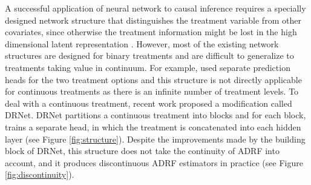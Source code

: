\documentclass{article} %
\begin{document}
A successful application of neural network to causal inference requires a specially designed network structure that distinguishes the treatment variable from other covariates, since otherwise the treatment information might be lost in the high dimensional latent representation \citep{shalit2017estimating}. However, most of the existing network structures are designed for binary treatments and are difficult to generalize to treatments taking value in continuum. For example, \cite{shalit2017estimating, louizos2017causal, schwab2019learning, shi2019adapting} used separate prediction heads for the two treatment options and this structure is not directly applicable for continuous treatments as there is an infinite number of treatment levels. To deal with a continuous treatment, recent work \citep{schwab2019learning} proposed a modification called DRNet. DRNet partitions a continuous treatment into blocks and for each block, trains a separate head, in which the treatment is concatenated into each hidden layer (see Figure \ref{fig:structure}). Despite the improvements made by the building block of DRNet, this structure does not take the continuity of ADRF \citep{prichard1971assessment, schneider1993dose,threlfall1999sun} into account, and  it produces discontinuous ADRF estimators in practice (see Figure \ref{fig:discontinuity}). 



\end{document}
